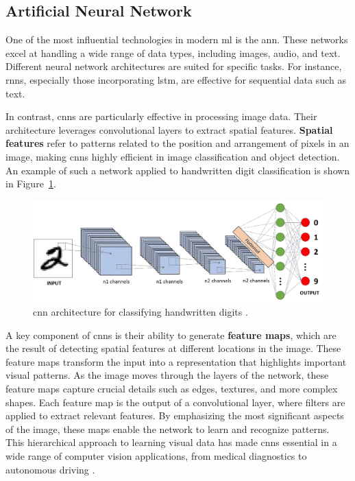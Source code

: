 \subsection{Artificial Neural Network}

One of the most influential technologies in modern \gls{ml} is the \gls{ann}. These networks excel at handling a wide range of data types, including images, audio, and text. Different neural network architectures are suited for specific tasks. For instance, \glspl{rnn}, especially those incorporating \gls{lstm}, are effective for sequential data such as text. \\

\newpage

In contrast, \glspl{cnn} are particularly effective in processing image data. Their architecture leverages convolutional layers to extract spatial features. \textbf{Spatial features} refer to patterns related to the position and arrangement of pixels in an image, making \glspl{cnn} highly efficient in image classification and object detection. An example of such a network applied to handwritten digit classification is shown in Figure~\ref{fig:convolutional-neural-network}.  \\

\begin{figure}[h!] 
    \centering 
    \includegraphics[width=0.75\linewidth]{figures/theory/machine-learning/convolutional-neural-network.png} \caption[CNN architecture for handwritten digit classification]{\gls{cnn} architecture for classifying handwritten digits \cite{medium:cnn}.} 
    \label{fig:convolutional-neural-network} 
\end{figure}

A key component of \glspl{cnn} is their ability to generate \textbf{feature maps}, which are the result of detecting spatial features at different locations in the image. These feature maps transform the input into a representation that highlights important visual patterns. As the image moves through the layers of the network, these feature maps capture crucial details such as edges, textures, and more complex shapes. Each feature map is the output of a convolutional layer, where filters are applied to extract relevant features. By emphasizing the most significant aspects of the image, these maps enable the network to learn and recognize patterns. This hierarchical approach to learning visual data has made \glspl{cnn} essential in a wide range of computer vision applications, from medical diagnostics to autonomous driving \cite{encord:cnn}. \\


